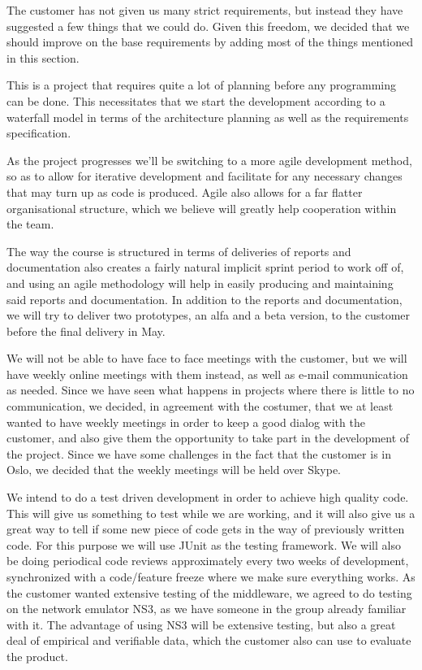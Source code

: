 \documentclass[12pt]{article}
\begin{document}
    The customer has not given us many strict requirements, but instead they have suggested a few things that we could do. Given this freedom, we decided that we should improve on the base requirements by adding most of the things mentioned in this section.

    This is a project that requires quite a lot of planning before any programming can be done. This necessitates that we start the development according to a waterfall model in terms of the architecture planning as well as the requirements specification.
    
    As the project progresses we’ll be switching to a more agile development method, so as to allow for iterative development and facilitate for any necessary changes that may turn up as code is produced. Agile also allows for a far flatter organisational structure, which we believe will greatly help cooperation within the team.
    
    The way the course is structured in terms of deliveries of reports and documentation also creates a fairly natural implicit sprint period to work off of, and using an agile methodology will help in easily producing and maintaining said reports and documentation. In addition to the  reports and documentation, we will try to deliver two prototypes, an alfa and a beta version, to the customer before the final delivery in May.

    We will not be able to have face to face meetings with the customer, but we will have weekly online meetings with them instead, as well as e-mail communication as needed. Since we have seen what happens in projects where there is little to no communication, we decided, in agreement with the costumer, that we at least wanted to have weekly meetings in order  to keep a good dialog with the customer, and also give them the opportunity to take part in the development of the project. Since we have some challenges in the fact that the customer is in Oslo, we decided that the weekly meetings will be held over Skype.

    We  intend to do a test driven development in order to achieve high quality code. This will give us something to test while we are working, and it will also give us a great way to tell if some new piece of code gets in the way of previously written code. For this purpose we will use JUnit as the testing framework. We will also be doing periodical code reviews approximately every two weeks of development, synchronized with a code/feature freeze where we make sure everything works. As the customer wanted extensive testing of the middleware, we agreed to do testing on the network emulator NS3, as we have someone in the group already familiar with it. The advantage of using NS3 will be extensive testing, but also a great deal of empirical and verifiable data, which the customer also can use to evaluate the product.
\end{document}

